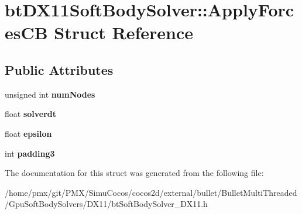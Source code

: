 \hypertarget{structbtDX11SoftBodySolver_1_1ApplyForcesCB}{}\section{bt\+D\+X11\+Soft\+Body\+Solver\+:\+:Apply\+Forces\+CB Struct Reference}
\label{structbtDX11SoftBodySolver_1_1ApplyForcesCB}
\subsection*{Public Attributes}
\begin{DoxyCompactItemize}
\item 
\mbox{\label{structbtDX11SoftBodySolver_1_1ApplyForcesCB_a3f507da3dd0db440a0caba553016dd8e}} 
unsigned int {\bfseries num\+Nodes}
\item 
\mbox{\label{structbtDX11SoftBodySolver_1_1ApplyForcesCB_a1e054c9d6f0e33c6fc037cd80e68dc34}} 
float {\bfseries solverdt}
\item 
\mbox{\label{structbtDX11SoftBodySolver_1_1ApplyForcesCB_aaaa330af6165c373d127e120e73c2b22}} 
float {\bfseries epsilon}
\item 
\mbox{\label{structbtDX11SoftBodySolver_1_1ApplyForcesCB_a3ae26609b368192dc567bbc7427c9ab6}} 
int {\bfseries padding3}
\end{DoxyCompactItemize}


The documentation for this struct was generated from the following file\+:\begin{DoxyCompactItemize}
\item 
/home/pmx/git/\+P\+M\+X/\+Simu\+Cocos/cocos2d/external/bullet/\+Bullet\+Multi\+Threaded/\+Gpu\+Soft\+Body\+Solvers/\+D\+X11/bt\+Soft\+Body\+Solver\+\_\+\+D\+X11.\+h\end{DoxyCompactItemize}
